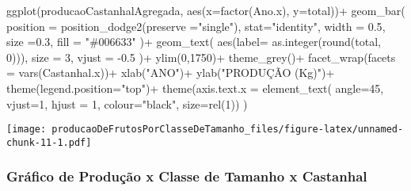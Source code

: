 \documentclass[
]{article}
\newenvironment{Shaded}{\begin{snugshade}}{\end{snugshade}}
\newcommand{\AttributeTok}[1]{\textcolor[rgb]{0.77,0.63,0.00}{#1}}
\newcommand{\DecValTok}[1]{\textcolor[rgb]{0.00,0.00,0.81}{#1}}
\newcommand{\FloatTok}[1]{\textcolor[rgb]{0.00,0.00,0.81}{#1}}
\newcommand{\FunctionTok}[1]{\textcolor[rgb]{0.00,0.00,0.00}{#1}}
\newcommand{\NormalTok}[1]{#1}
\newcommand{\SpecialCharTok}[1]{\textcolor[rgb]{0.00,0.00,0.00}{#1}}
\newcommand{\StringTok}[1]{\textcolor[rgb]{0.31,0.60,0.02}{#1}}
\begin{document}
\begin{Shaded}
\begin{Highlighting}[]
\FunctionTok{ggplot}\NormalTok{(producaoCastanhalAgregada, }\FunctionTok{aes}\NormalTok{(}\AttributeTok{x=}\FunctionTok{factor}\NormalTok{(Ano.x), }\AttributeTok{y=}\NormalTok{total))}\SpecialCharTok{+}
  \FunctionTok{geom\_bar}\NormalTok{(}
    \AttributeTok{position =} \FunctionTok{position\_dodge2}\NormalTok{(}\AttributeTok{preserve =}\StringTok{"single"}\NormalTok{),}
    \AttributeTok{stat=}\StringTok{"identity"}\NormalTok{,}
    \AttributeTok{width =} \FloatTok{0.5}\NormalTok{,}
    \AttributeTok{size =}\FloatTok{0.3}\NormalTok{,}
    \AttributeTok{fill =} \StringTok{"\#006633"}
\NormalTok{    )}\SpecialCharTok{+}
  \FunctionTok{geom\_text}\NormalTok{(}
    \FunctionTok{aes}\NormalTok{(}\AttributeTok{label=} \FunctionTok{as.integer}\NormalTok{(}\FunctionTok{round}\NormalTok{(total, }\DecValTok{0}\NormalTok{))),}
    \AttributeTok{size =} \DecValTok{3}\NormalTok{,}
    \AttributeTok{vjust =} \SpecialCharTok{{-}}\FloatTok{0.5}
\NormalTok{    )}\SpecialCharTok{+}
  \FunctionTok{ylim}\NormalTok{(}\DecValTok{0}\NormalTok{,}\DecValTok{1750}\NormalTok{)}\SpecialCharTok{+}
  \FunctionTok{theme\_grey}\NormalTok{()}\SpecialCharTok{+}
  \FunctionTok{facet\_wrap}\NormalTok{(}\AttributeTok{facets =} \FunctionTok{vars}\NormalTok{(Castanhal.x))}\SpecialCharTok{+}
  \FunctionTok{xlab}\NormalTok{(}\StringTok{"ANO"}\NormalTok{)}\SpecialCharTok{+}
  \FunctionTok{ylab}\NormalTok{(}\StringTok{"PRODUÇÃO (Kg)"}\NormalTok{)}\SpecialCharTok{+}
  \FunctionTok{theme}\NormalTok{(}\AttributeTok{legend.position=}\StringTok{"top"}\NormalTok{)}\SpecialCharTok{+}
  \FunctionTok{theme}\NormalTok{(}\AttributeTok{axis.text.x =} \FunctionTok{element\_text}\NormalTok{(}
    \AttributeTok{angle=}\DecValTok{45}\NormalTok{,}
    \AttributeTok{vjust=}\DecValTok{1}\NormalTok{,}
    \AttributeTok{hjust =} \DecValTok{1}\NormalTok{,}
    \AttributeTok{colour=}\StringTok{"black"}\NormalTok{,}
    \AttributeTok{size=}\FunctionTok{rel}\NormalTok{(}\DecValTok{1}\NormalTok{))}
\NormalTok{    )}
\end{Highlighting}
\end{Shaded}

\texttt{[image: producaoDeFrutosPorClasseDeTamanho\_files/figure-latex/unnamed-chunk-11-1.pdf]}

\hypertarget{gruxe1fico-de-produuxe7uxe3o-x-classe-de-tamanho-x-castanhal}{%
\subsubsection{Gráfico de Produção x Classe de Tamanho x
Castanhal}\label{gruxe1fico-de-produuxe7uxe3o-x-classe-de-tamanho-x-castanhal}}
\end{document}
